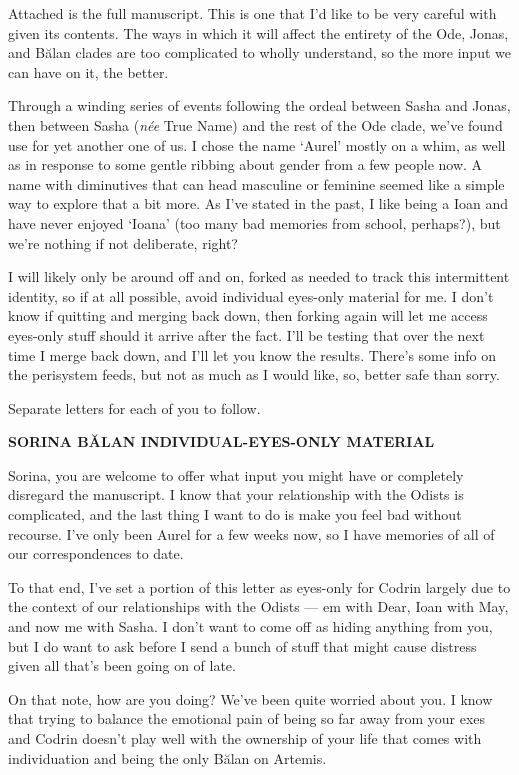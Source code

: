 Attached is the full manuscript. This is one that I'd like to be very careful with given its contents. The ways in which it will affect the entirety of the Ode, Jonas, and Bălan clades are too complicated to wholly understand, so the more input we can have on it, the better.

Through a winding series of events following the ordeal between Sasha and Jonas, then between Sasha (\emph{née} True Name) and the rest of the Ode clade, we've found use for yet another one of us. I chose the name `Aurel' mostly on a whim, as well as in response to some gentle ribbing about gender from a few people now. A name with diminutives that can head masculine or feminine seemed like a simple way to explore that a bit more. As I've stated in the past, I like being a Ioan and have never enjoyed `Ioana' (too many bad memories from school, perhaps?), but we're nothing if not deliberate, right?

I will likely only be around off and on, forked as needed to track this intermittent identity, so if at all possible, avoid individual eyes-only material for me. I don't know if quitting and merging back down, then forking again will let me access eyes-only stuff should it arrive after the fact. I'll be testing that over the next time I merge back down, and I'll let you know the results. There's some info on the perisystem feeds, but not as much as I would like, so, better safe than sorry.

Separate letters for each of you to follow.

\begin{center}
\textbf{SORINA BĂLAN INDIVIDUAL-EYES-ONLY MATERIAL}
\end{center}

Sorina, you are welcome to offer what input you might have or completely disregard the manuscript. I know that your relationship with the Odists is complicated, and the last thing I want to do is make you feel bad without recourse. I've only been Aurel for a few weeks now, so I have memories of all of our correspondences to date.

To that end, I've set a portion of this letter as eyes-only for Codrin largely due to the context of our relationships with the Odists — em with Dear, Ioan with May, and now me with Sasha. I don't want to come off as hiding anything from you, but I do want to ask before I send a bunch of stuff that might cause distress given all that's been going on of late.

On that note, how are you doing? We've been quite worried about you. I know that trying to balance the emotional pain of being so far away from your exes and Codrin doesn't play well with the ownership of your life that comes with individuation and being the only Bălan on Artemis.

